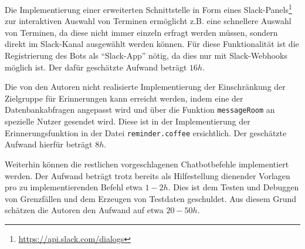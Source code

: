 Die Implementierung einer erweiterten Schnittstelle in Form eines Slack-Panels\footnote{\url{https://api.slack.com/dialogs}} zur interaktiven Auswahl von Terminen ermöglicht z.B. eine schnellere Auswahl von Terminen, da diese nicht immer einzeln erfragt werden müssen, sondern direkt im Slack-Kanal ausgewählt werden können.
Für diese Funktionalität ist die Registrierung des Bots als \enquote{Slack-App} nötig, da dies nur mit Slack-Webhooks möglich ist.
Der dafür geschätzte Aufwand beträgt $16h$.

Die von den Autoren nicht realisierte Implementierung der Einschränkung der Zielgruppe für Erinnerungen kann erreicht werden, indem eine der Datenbankabfragen angepasst wird und über die Funktion \texttt{messageRoom} an spezielle Nutzer gesendet wird. Diese ist in der Implementierung der Erinnerungsfunktion in der Datei \texttt{reminder.coffee} ersichtlich. Der geschätzte Aufwand hierfür beträgt $8h$.

Weiterhin können die restlichen vorgeschlagenen Chatbotbefehle implementiert werden. Der Aufwand beträgt trotz bereits als Hilfestellung dienender Vorlagen pro zu implementierenden Befehl etwa $1-2h$. Dies ist dem Testen und Debuggen von Grenzfällen und dem Erzeugen von Testdaten geschuldet. Aus diesem Grund schätzen die Autoren den Aufwand auf etwa $20-50h$.

